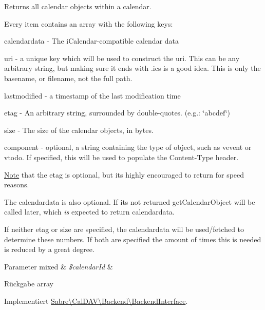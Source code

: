 Returns all calendar objects within a calendar.

Every item contains an array with the following keys\+:
\begin{DoxyItemize}
\item calendardata -\/ The i\+Calendar-\/compatible calendar data
\item uri -\/ a unique key which will be used to construct the uri. This can be any arbitrary string, but making sure it ends with \textquotesingle{}.ics\textquotesingle{} is a good idea. This is only the basename, or filename, not the full path.
\item lastmodified -\/ a timestamp of the last modification time
\item etag -\/ An arbitrary string, surrounded by double-\/quotes. (e.\+g.\+: \textquotesingle{}\char`\"{}abcdef\char`\"{}\textquotesingle{})
\item size -\/ The size of the calendar objects, in bytes.
\item component -\/ optional, a string containing the type of object, such as \textquotesingle{}vevent\textquotesingle{} or \textquotesingle{}vtodo\textquotesingle{}. If specified, this will be used to populate the Content-\/\+Type header.
\end{DoxyItemize}

\mbox{\hyperlink{class_note}{Note}} that the etag is optional, but it\textquotesingle{}s highly encouraged to return for speed reasons.

The calendardata is also optional. If it\textquotesingle{}s not returned \textquotesingle{}get\+Calendar\+Object\textquotesingle{} will be called later, which {\itshape is} expected to return calendardata.

If neither etag or size are specified, the calendardata will be used/fetched to determine these numbers. If both are specified the amount of times this is needed is reduced by a great degree.


\begin{DoxyParams}[1]{Parameter}
mixed & {\em \$calendar\+Id} & \\
\hline
\end{DoxyParams}
\begin{DoxyReturn}{Rückgabe}
array 
\end{DoxyReturn}


Implementiert \mbox{\hyperlink{interface_sabre_1_1_cal_d_a_v_1_1_backend_1_1_backend_interface_aaa786269ba9eb1731fb659b67f684ac2}{Sabre\textbackslash{}\+Cal\+D\+A\+V\textbackslash{}\+Backend\textbackslash{}\+Backend\+Interface}}.



